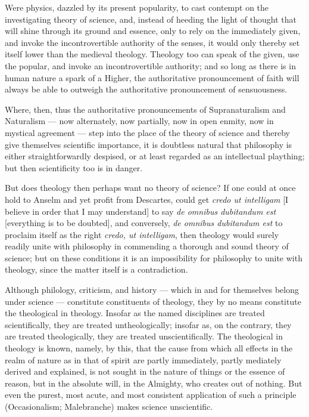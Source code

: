 \documentclass[12pt]{book}
\begin{document}
Were physics, dazzled by its present popularity, to cast contempt on the investigating
theory of science, and, instead of heeding the light of thought that will shine through
its ground and essence, only to rely on the immediately given, and invoke the
incontrovertible authority of the senses, it would only thereby set itself lower than
the medieval
theology. Theology too can speak of the given, use the popular, and invoke an
incontrovertible authority; and so long as there is in human nature a spark of a Higher,
the authoritative pronouncement of faith will always be able to outweigh the
authoritative pronouncement of sensuousness.

Where, then, thus the authoritative pronouncements of Supranaturalism and Naturalism —
now alternately, now partially, now in open enmity, now in mystical agreement — step into
the place of the theory of science and thereby give themselves scientific importance, it
is doubtless natural that philosophy is either straightforwardly despised, or at least
regarded as an intellectual plaything; but then scientificity too is in danger.

But does theology then perhaps want no theory of science? If one could at once hold to
Anselm and yet profit from Descartes, could get \textit{credo ut intelligam} [I believe
in order that I may understand] to say \textit{de omnibus dubitandum est} [everything is
to be doubted], and conversely, \textit{de omnibus dubitandum est} to proclaim itself as
the right \textit{credo, ut intelligam}, then theology would surely readily unite with
philosophy in commending a thorough and sound theory of science; but on these conditions
it is an impossibility for philosophy to unite with theology, since the matter itself is
a contradiction.

Although philology, criticism, and history — which in and for themselves belong under
science — constitute constituents of theology, they by no means constitute the
theological in theology. Insofar as the named disciplines are treated scientifically,
they are treated untheologically; insofar as, on the contrary, they are treated
theologically, they are treated unscientifically. The theological in theology is known,
namely, by this, that the cause from which all effects in the realm of nature as in that
of spirit are partly immediately, partly mediately derived and explained, is not sought
in the nature of things or the essence of reason, but in the absolute will, in the
Almighty, who creates out of nothing. But even the purest, most acute, and most
consistent application of such a
principle (Occasionalism; Malebranche) makes science unscientific.
\end{document}
